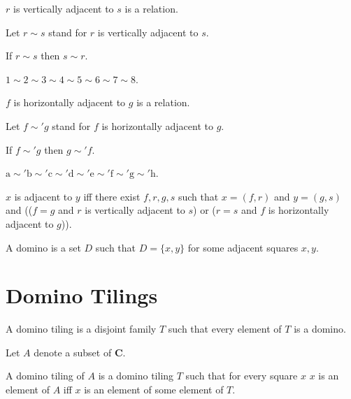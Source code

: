 \documentclass{article}
\newcommand{\fileA}{\mathrm{a}}
\newcommand{\fileB}{\mathrm{b}}
\newcommand{\fileC}{\mathrm{c}}
\newcommand{\fileD}{\mathrm{d}}
\newcommand{\fileE}{\mathrm{e}}
\newcommand{\fileF}{\mathrm{f}}
\newcommand{\fileG}{\mathrm{g}}
\newcommand{\fileH}{\mathrm{h}}
\newcommand{\vertadj}{\sim}
\newcommand{\horizadj}{\sim'} %
\newcommand{\Checkerboard}{\mathbf{C}}
\begin{document}
\begin{forthel}
    \begin{signature}
        $r$ is vertically adjacent to $s$ is a relation.
    \end{signature}
    Let $r\vertadj s$ stand for $r$ is vertically adjacent to $s$.

    \begin{axiom}
        If $r\vertadj s$ then $s\vertadj r$.
    \end{axiom}
    \begin{axiom}
        $1\vertadj 2\vertadj 3\vertadj 4\vertadj 5\vertadj 6\vertadj 7\vertadj 8$.
    \end{axiom}

    \begin{signature}
        $f$ is horizontally adjacent to $g$ is a relation.
    \end{signature}
    Let $f\horizadj g$ stand for $f$ is horizontally adjacent to $g$.

    \begin{axiom}
        If $f \horizadj g$ then $g \horizadj f$.
    \end{axiom}
    \begin{axiom}
        $\fileA \horizadj \fileB \horizadj \fileC \horizadj \fileD
        \horizadj \fileE \horizadj \fileF \horizadj \fileG \horizadj \fileH$.
    \end{axiom}

    \begin{definition}
        $x$ is adjacent to $y$ iff
        there exist $f, r, g, s$ such that
        $x = (f, r)$ and $y = (g, s)$ and
        (($f = g$ and $r$ is vertically adjacent to $s$) or
         ($r = s$ and $f$ is horizontally adjacent to $g$)).
    \end{definition}

    \begin{definition}
        A domino is a set $D$ such that $D = \{x,y\}$ for some
        adjacent squares $x, y$.
    \end{definition}
\end{forthel}



\section{Domino Tilings}

\begin{forthel}
    \begin{definition}
        A domino tiling is a disjoint family $T$ such that every element of $T$ is a domino.
    \end{definition}

    Let $A$ denote a subset of $\Checkerboard$.

    \begin{definition}
        A domino tiling of $A$ is a domino tiling $T$
        such that for every square $x$
        $x$ is an element of $A$ iff
        $x$ is an element of some element of $T$.
    \end{definition}
\end{forthel}
\end{document}
